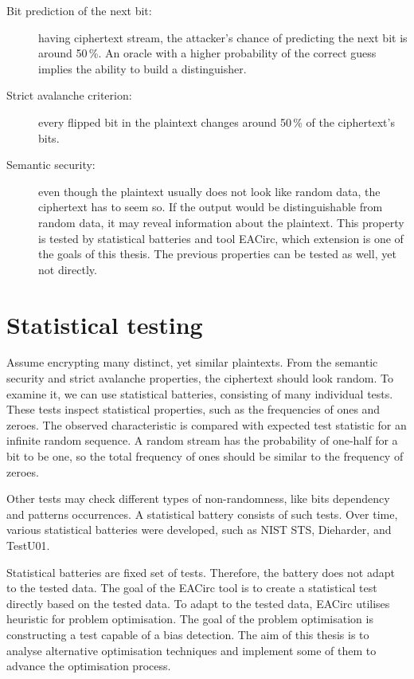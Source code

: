\documentclass[
    digital,    %
    oneside,    %
    color,
    11pt,
    nocover,
    notable,
    nolof,
    nolot,
]{fithesis3}
\begin{document}
\begin{description}
    \item[Bit prediction of the next bit:] having ciphertext stream, the attacker's chance of predicting the next bit is around 50\,\%. An oracle with a higher probability of the correct guess implies the ability to build a distinguisher.

    \item[Strict avalanche criterion:] every flipped bit in the plaintext changes around 50\,\% of the ciphertext's bits.

    \item[Semantic security:] even though the plaintext usually does not look like random data, the ciphertext has to seem so. If the output would be distinguishable from random data, it may reveal information about the plaintext. This property is tested by statistical batteries and tool EACirc, which extension is one of the goals of this thesis. The previous properties can be tested as well, yet not directly.
\end{description}


\section{Statistical testing}
\label{sec:stat-testing}

Assume encrypting many distinct, yet similar plaintexts. From the semantic security and strict avalanche properties, the ciphertext should look random. To examine it, we can use statistical batteries, consisting of many individual tests. These tests inspect statistical properties, such as the frequencies of ones and zeroes. The observed characteristic is compared with expected test statistic for an infinite random sequence. A random stream has the probability of one-half for a bit to be one, so the total frequency of ones should be similar to the frequency of zeroes.

Other tests may check different types of non-randomness, like bits dependency and patterns occurrences. A statistical battery consists of such tests. Over time, various statistical batteries were developed, such as NIST STS, Dieharder, and TestU01.

Statistical batteries are fixed set of tests. Therefore, the battery does not adapt to the tested data. The goal of the EACirc tool is to create a statistical test directly based on the tested data. To adapt to the tested data, EACirc utilises heuristic for problem optimisation. The goal of the problem optimisation is constructing a test capable of a bias detection. The aim of this thesis is to analyse alternative optimisation techniques and implement some of them to advance the optimisation process.
\end{document}
